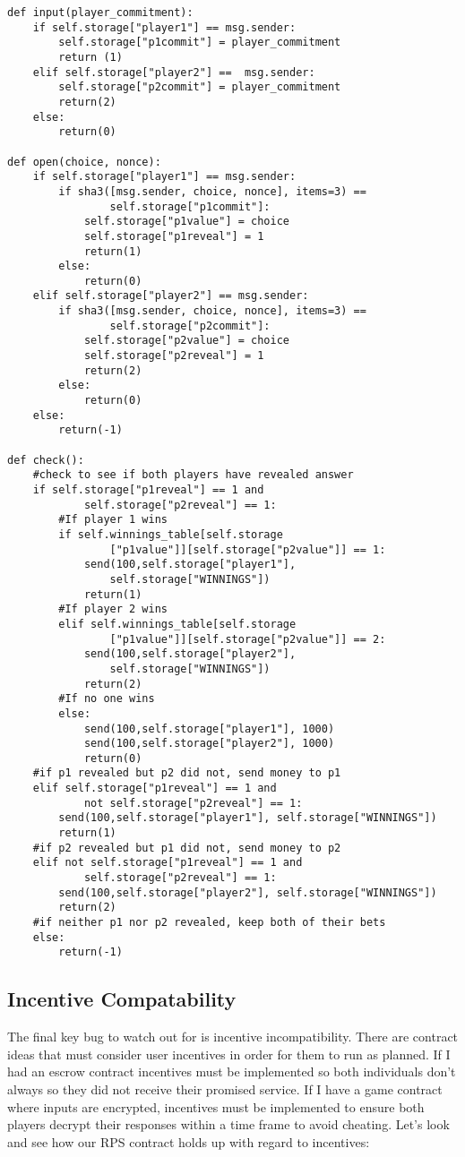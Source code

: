 \documentclass[12pt]{article}
\begin{document}
\begin{lstlisting}[frame=single]
def input(player_commitment):
	if self.storage["player1"] == msg.sender:
		self.storage["p1commit"] = player_commitment
		return (1)
	elif self.storage["player2"] ==  msg.sender:
		self.storage["p2commit"] = player_commitment
		return(2)
	else:
		return(0)

def open(choice, nonce):
	if self.storage["player1"] == msg.sender:
		if sha3([msg.sender, choice, nonce], items=3) == 
				self.storage["p1commit"]:
			self.storage["p1value"] = choice
			self.storage["p1reveal"] = 1
			return(1)
		else:
			return(0)
	elif self.storage["player2"] == msg.sender:
		if sha3([msg.sender, choice, nonce], items=3) == 
				self.storage["p2commit"]:
			self.storage["p2value"] = choice
			self.storage["p2reveal"] = 1
			return(2)
		else:
			return(0)
	else:
		return(-1)

def check():
	#check to see if both players have revealed answer
	if self.storage["p1reveal"] == 1 and 
			self.storage["p2reveal"] == 1:
		#If player 1 wins
		if self.winnings_table[self.storage
				["p1value"]][self.storage["p2value"]] == 1:
			send(100,self.storage["player1"], 
				self.storage["WINNINGS"])
			return(1)
		#If player 2 wins
		elif self.winnings_table[self.storage
				["p1value"]][self.storage["p2value"]] == 2:
			send(100,self.storage["player2"], 
				self.storage["WINNINGS"])
			return(2)
		#If no one wins
		else:
			send(100,self.storage["player1"], 1000)
			send(100,self.storage["player2"], 1000)
			return(0)
	#if p1 revealed but p2 did not, send money to p1
	elif self.storage["p1reveal"] == 1 and 
			not self.storage["p2reveal"] == 1:
		send(100,self.storage["player1"], self.storage["WINNINGS"])
		return(1)
	#if p2 revealed but p1 did not, send money to p2
	elif not self.storage["p1reveal"] == 1 and 
			self.storage["p2reveal"] == 1:
		send(100,self.storage["player2"], self.storage["WINNINGS"])
		return(2)
	#if neither p1 nor p2 revealed, keep both of their bets
	else:
		return(-1)
\end{lstlisting}

\subsection{Incentive Compatability}
The final key bug to watch out for is incentive incompatibility. There are contract ideas that must consider user incentives in order for them to run as planned. If I had an escrow contract incentives must be implemented so both individuals don't always so they did not receive their promised service. If I have a game contract where inputs are encrypted, incentives must be implemented to ensure both players decrypt their responses within a time frame to avoid cheating. Let's look and see how our RPS contract holds up with regard to incentives:
\end{document}
